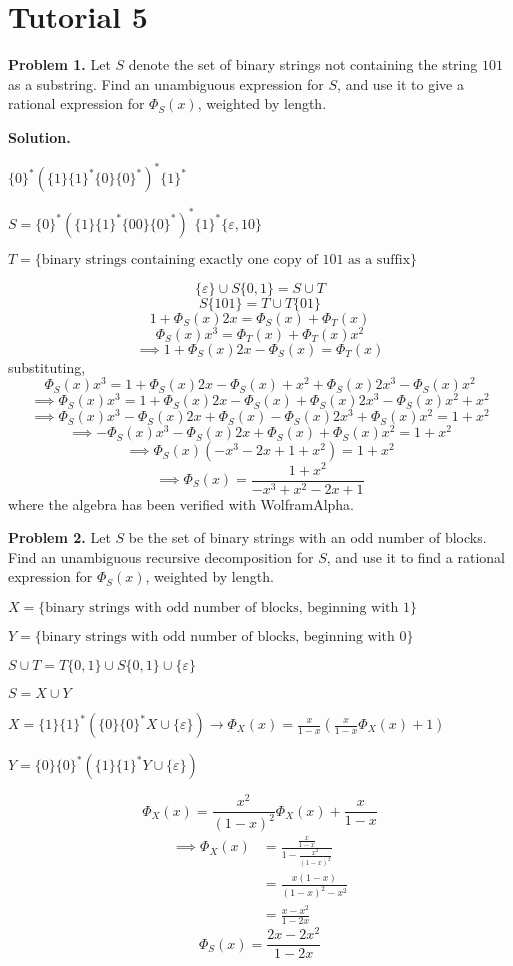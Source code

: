\section{Tutorial 5}

\textbf{Problem 1.}
Let $ S $ denote the set of binary strings not containing the string $ 101 $
as a substring. Find an unambiguous expression for $ S $, and use it to give a
rational expression for $ \Phi_S(x) $, weighted by length.

\textbf{Solution.}

$ \{0\}^* (\{1\}\{1\}^*\{0\}\{0\}^*)^*\{1\}^* $

$ S = \{0\}^*(\{1\}\{1\}^*\{00\}\{0\}^*)^*\{1\}^*\{\varepsilon, 10\} $

$ T=\{\text{binary strings containing exactly one copy of } 101\text{ as a suffix}\} $

\[ \{\varepsilon\}\cup S \{0,1\}=S \cup T \]
\[ S \{101\}=T\cup T \{01\} \]
\[ 1+\Phi_S(x)2x=\Phi_S(x)+\Phi_T(x) \]
\[ \Phi_S(x)x^3=\Phi_T(x)+\Phi_T(x)x^2 \]
\[ \implies 1+\Phi_S(x)2x-\Phi_S(x)=\Phi_T(x) \]
substituting,
\[ \Phi_S(x)x^3=1+\Phi_S(x)2x-\Phi_S(x)+x^2+\Phi_S(x)2x^3-\Phi_S(x)x^2 \]
\[ \implies\Phi_S(x)x^3=1+\Phi_S(x)2x-\Phi_S(x)+\Phi_S(x)2x^3-\Phi_S(x)x^2+x^2 \]
\[ \implies\Phi_S(x)x^3-\Phi_S(x)2x+\Phi_S(x)-\Phi_S(x)2x^3+\Phi_S(x)x^2=1+x^2 \]
\[ \implies-\Phi_S(x)x^3-\Phi_S(x)2x+\Phi_S(x)+\Phi_S(x)x^2=1+x^2 \]
\[ \implies\Phi_S(x)(-x^3-2x+1+x^2)=1+x^2 \]
\[ \implies\Phi_S(x)=\frac{1+x^2}{-x^3+x^2-2x+1} \]
where the algebra has been verified with WolframAlpha.

\textbf{Problem 2.}
Let $ S $ be the set of binary strings with an odd number of blocks. Find
an unambiguous recursive decomposition for $ S $, and use it to find a rational
expression for $ \Phi_S(x) $, weighted by length.

$ X=\{\text{binary strings with odd number of blocks, beginning with }1\} $

$ Y=\{\text{binary strings with odd number of blocks, beginning with }0\} $

$ S\cup T = T \{0,1\}\cup S \{0,1\} \cup \{\varepsilon\} $

$ S=X\cup Y $

$ X=\{1\}\{1\}^*(\{0\}\{0\}^* X \cup \{\varepsilon\}) \rightarrow
\Phi_X(x)=\frac{x}{1-x}\left( \frac{x}{1-x} \Phi_X(x)+1 \right)$

$ Y=\{0\}\{0\}^*(\{1\}\{1\}^* Y\cup \{\varepsilon\}) $

\[ \Phi_X(x)=\frac{x^2}{(1-x)^2}\Phi_X(x)+\frac{x}{1-x} \]
\begin{align*}
    \implies\Phi_X(x)
    &=\frac{\frac{x}{1-x}}{1-\frac{x^2}{(1-x)^2}}\\
    &=\frac{x(1-x)}{(1-x)^2-x^2}\\
    &=\frac{x-x^2}{1-2x}
\end{align*}
\[ \Phi_S(x)=\frac{2x-2x^2}{1-2x} \]

